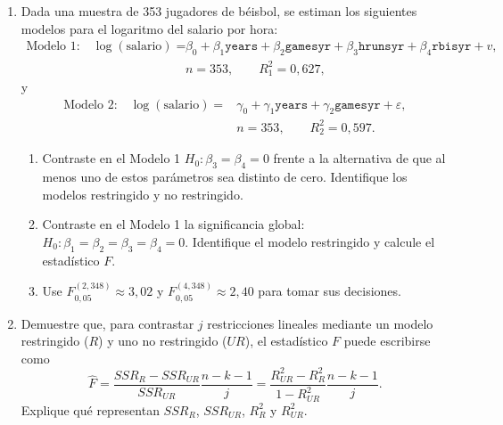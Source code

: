\documentclass[letterpaper,11pt]{article}
\begin{document}
\begin{enumerate}[resume]

\item Dada una muestra de 353 jugadores de béisbol, se estiman los siguientes modelos
    para el logaritmo del salario por hora:
    \[
    \begin{aligned}
        \text{Modelo 1:}\quad
        \log(\text{salario})={}&\beta_0+\beta_1\texttt{years}
        +\beta_2\texttt{gamesyr}+\beta_3\texttt{hrunsyr}
        +\beta_4\texttt{rbisyr}+v,\\
        &n=353,\qquad R_1^2=0{,}627,
    \end{aligned}
    \]
    y
    \[
    \begin{aligned}
        \text{Modelo 2:}\quad
        \log(\text{salario})={}&\gamma_0+\gamma_1\texttt{years}
        +\gamma_2\texttt{gamesyr}+\varepsilon,\\
        &n=353,\qquad R_2^2=0{,}597.
    \end{aligned}
    \]
    \begin{enumerate}[label=(\alph*)]
        \item Contraste en el Modelo 1
              $H_0:\beta_3=\beta_4=0$ frente a la alternativa de que al
              menos uno de estos parámetros sea distinto de cero. Identifique
              los modelos restringido y no restringido.
        \item Contraste en el Modelo 1 la significancia global:
              $H_0:\beta_1=\beta_2=\beta_3=\beta_4=0$. Identifique el modelo
              restringido y calcule el estadístico $F$.
        \item Use $F_{0{,}05}^{(2,348)}\approx3{,}02$ y
              $F_{0{,}05}^{(4,348)}\approx2{,}40$ para tomar sus decisiones.
    \end{enumerate}

\item Demuestre que, para contrastar $j$ restricciones lineales mediante un
    modelo restringido ($R$) y uno no restringido ($UR$), el estadístico $F$
    puede escribirse como
    \[
        \widehat F
        =\frac{SSR_R-SSR_{UR}}{SSR_{UR}}
         \frac{n-k-1}{j}
        =\frac{R^2_{UR}-R^2_R}{1-R^2_{UR}}
         \frac{n-k-1}{j}.
    \]
    Explique qué representan $SSR_R$, $SSR_{UR}$, $R_R^2$ y $R_{UR}^2$.


\end{enumerate}
\end{document}
